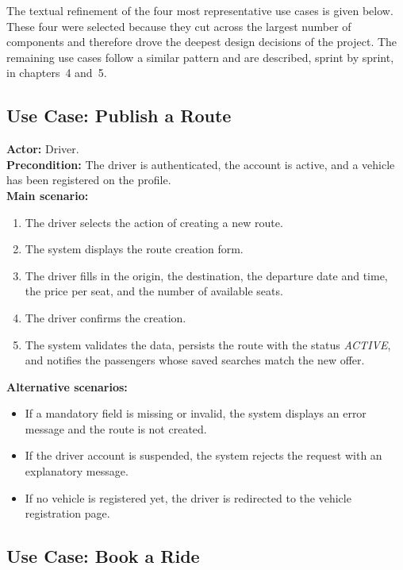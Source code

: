 The textual refinement of the four most representative use cases is given below. These four were selected because they cut across the largest number of components and therefore drove the deepest design decisions of the project. The remaining use cases follow a similar pattern and are described, sprint by sprint, in chapters~4 and~5.

\subsection{Use Case: Publish a Route}

\textbf{Actor:} Driver.\\
\textbf{Precondition:} The driver is authenticated, the account is active, and a vehicle has been registered on the profile.\\
\textbf{Main scenario:}
\begin{enumerate}[noitemsep]
    \item The driver selects the action of creating a new route.
    \item The system displays the route creation form.
    \item The driver fills in the origin, the destination, the departure date and time, the price per seat, and the number of available seats.
    \item The driver confirms the creation.
    \item The system validates the data, persists the route with the status \textit{ACTIVE}, and notifies the passengers whose saved searches match the new offer.
\end{enumerate}
\textbf{Alternative scenarios:}
\begin{itemize}[noitemsep]
    \item If a mandatory field is missing or invalid, the system displays an error message and the route is not created.
    \item If the driver account is suspended, the system rejects the request with an explanatory message.
    \item If no vehicle is registered yet, the driver is redirected to the vehicle registration page.
\end{itemize}

\subsection{Use Case: Book a Ride}

